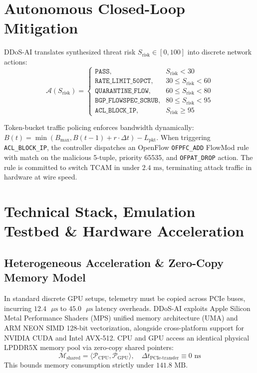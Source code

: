 \documentclass[journal]{IEEEtran}
\begin{document}
\section{Autonomous Closed-Loop Mitigation}
DDoS-AI translates synthesized threat risk $S_{\text{risk}} \in [0, 100]$ into discrete network actions:
\begin{equation}
\mathcal{A}(S_{\text{risk}}) = 
\begin{cases}
\texttt{PASS}, & S_{\text{risk}} < 30 \\
\texttt{RATE\_LIMIT\_50PCT}, & 30 \le S_{\text{risk}} < 60 \\
\texttt{QUARANTINE\_FLOW}, & 60 \le S_{\text{risk}} < 80 \\
\texttt{BGP\_FLOWSPEC\_SCRUB}, & 80 \le S_{\text{risk}} < 95 \\
\texttt{ACL\_BLOCK\_IP}, & S_{\text{risk}} \ge 95
\end{cases}
\end{equation}

Token-bucket traffic policing enforces bandwidth dynamically: $B(t) = \min(B_{\max}, B(t-1) + r \cdot \Delta t) - L_{\text{pkt}}$. When triggering \texttt{ACL\_BLOCK\_IP}, the controller dispatches an OpenFlow \texttt{OFPFC\_ADD} FlowMod rule with match on the malicious 5-tuple, priority 65535, and \texttt{OFPAT\_DROP} action. The rule is committed to switch TCAM in under $2.4\text{ ms}$, terminating attack traffic in hardware at wire speed.

\section{Technical Stack, Emulation Testbed \& Hardware Acceleration}
\subsection{Heterogeneous Acceleration \& Zero-Copy Memory Model}
In standard discrete GPU setups, telemetry must be copied across PCIe buses, incurring $12.4\text{ }\mu\text{s}$ to $45.0\text{ }\mu\text{s}$ latency overheads. DDoS-AI exploits Apple Silicon Metal Performance Shaders (MPS) unified memory architecture (UMA) and ARM NEON SIMD 128-bit vectorization, alongside cross-platform support for NVIDIA CUDA and Intel AVX-512. CPU and GPU access an identical physical LPDDR5X memory pool via zero-copy shared pointers:
\begin{equation}
\mathcal{M}_{\text{shared}} = \langle \mathcal{P}_{\text{CPU}}, \mathcal{P}_{\text{GPU}} \rangle, \quad \Delta t_{\text{PCIe-transfer}} \equiv 0\text{ ns}
\end{equation}
This bounds memory consumption strictly under $141.8\text{ MB}$.
\end{document}
